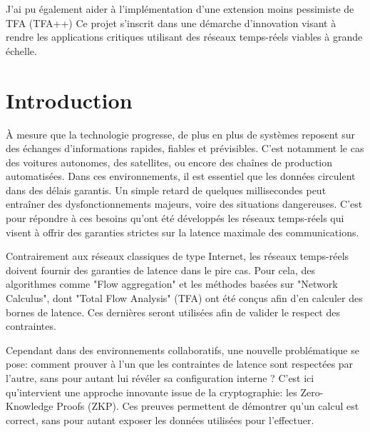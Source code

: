 \documentclass[12pt]{report}
\begin{document}
\vspace{0.2cm}

J'ai pu également aider à l'implémentation d'une extension moins pessimiste de TFA (TFA++)
Ce projet s'inscrit dans une démarche d'innovation visant à rendre 
les applications critiques utilisant des réseaux temps-réels viables à
grande échelle.


\tableofcontents
\newpage

\chapter{Introduction}
\setcounter{page}{1}

À mesure que la technologie progresse, de plus en plus de systèmes 
reposent sur des échanges d'informations rapides, fiables et 
prévisibles. C'est notamment le cas des voitures autonomes,
des satellites, ou encore des chaînes de 
production automatisées. Dans ces environnements, il est essentiel que 
les données circulent dans des 
délais garantis. Un simple retard de quelques millisecondes peut entraîner 
des dysfonctionnements majeurs, voire des situations dangereuses. 
C'est pour répondre à ces besoins qu'ont été développés les réseaux 
temps-réels qui visent à offrir des garanties strictes sur la latence 
maximale des communications.

\bigskip

Contrairement aux réseaux classiques de type Internet,
les réseaux temps-réels doivent fournir des garanties de latence dans le pire cas. 
Pour cela, des algorithmes comme "Flow aggregation" \cite{docquierDeterminingTightWorstcase2020}\cite{docquierMethodologiesPourLevaluation2021} et les méthodes basées sur "Network Calculus"\cite{leboudec2001network}, dont "Total Flow
Analysis" (TFA) ont été conçus afin d'en calculer des bornes de latence. Ces dernières seront utilisées 
afin de valider le respect des contraintes.

\bigskip

Cependant dans des environnements collaboratifs, une nouvelle problématique 
se pose: comment prouver à l'un que les contraintes de latence sont 
respectées par l'autre, sans pour autant lui révéler sa configuration interne ? 
C'est ici qu'intervient une approche innovante issue de la cryptographie: les Zero-Knowledge Proofs 
(ZKP). Ces preuves permettent de démontrer qu'un calcul est correct, 
sans pour autant exposer les données utilisées pour l'effectuer.
\end{document}
